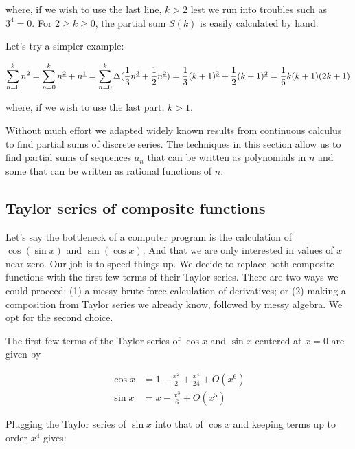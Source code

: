 \documentclass{article}
\begin{document}
\noindent where, if we wish to use the last line, $k > 2$ lest we run into
troubles such as $3^{\underline{4}}=0$. For $2 \geq k \geq 0$, the partial sum
$S(k)$ is easily calculated by hand.

Let's try a simpler example:

\[
    \sum\limits_{n=0}^k n^2 \\
    =\sum\limits_{n=0}^k n^{\underline{2}}+n^{\underline{1}} \\
    =\sum\limits_{n=0}^k \Delta (\frac{1}{3}n^{\underline{3}}+\frac{1}{2}n^{\underline{2}}) \\
    =\frac{1}{3}(k+1)^{\underline{3}}+\frac{1}{2}(k+1)^{\underline{2}} \\
    =\frac{1}{6}k(k+1)(2k+1)
\]

\noindent where, if we wish to use the last part, $k > 1$.

Without much effort we adapted widely known results from continuous calculus to
find partial sums of discrete series. The techniques in this section allow us
to find partial sums of sequences $a_n$ that can be written as polynomials in
$n$ and some that can be written as rational functions of $n$.


\subsection*{Taylor series of composite functions}

Let's say the bottleneck of a computer program is the calculation of $\cos(\sin
x)$ and $\sin(\cos x)$. And that we are only interested  in values of $x$ near
zero. Our job is to speed things up. We decide to replace both composite
functions with the first few terms of their Taylor series. There are two ways
we could proceed: (1) a messy brute-force calculation of derivatives; or (2)
making a composition from Taylor series we already know, followed by messy
algebra. We opt for the second choice.

The first few terms of the Taylor series of $\cos x$ and $\sin x$ centered at
$x=0$ are given by

\begin{align*}
    \cos x &= 1 - \frac{x^2}{2} + \frac{x^4}{24} + O(x^6) \\
    \sin x &= x - \frac{x^3}{6} + O(x^5)
\end{align*}

\noindent Plugging the Taylor series of $\sin x$ into that of $\cos x$ and
keeping terms up to order $x^4$ gives:
\end{document}
